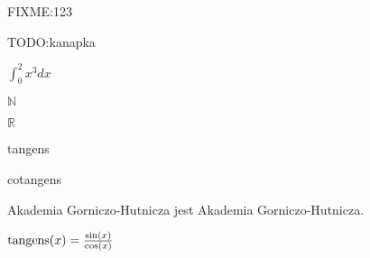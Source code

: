\documentclass[a4paper, 12pt]{article}
\newcommand{\fixme}[1]{\colorbox{yellow!50}{FIXME:{#1}}}
\newcommand{\todo}[1]{\colorbox{red!20}{TODO:{#1}}}
\newcommand{\myint}[3]{\colorbox{green!20}{\ensuremath{\int_{#1}^{#2} {#3} dx}}}
\def \R {$\mathbb{R}$}
\def \N {$\mathbb{N}$}
\def \tg {{\rm tangens}}
\def \ctg {{\rm cotangens}}
\def \agh {Akademia Gorniczo-Hutnicza}
\begin{document}
\fixme{123}

\todo{kanapka}

\myint{0}{2}{x^3}

\N

\R

\tg

\ctg

{\agh} jest \agh.

$\tg(x) = \frac{\sin(x)}{\cos(x)} $
\end{document}
